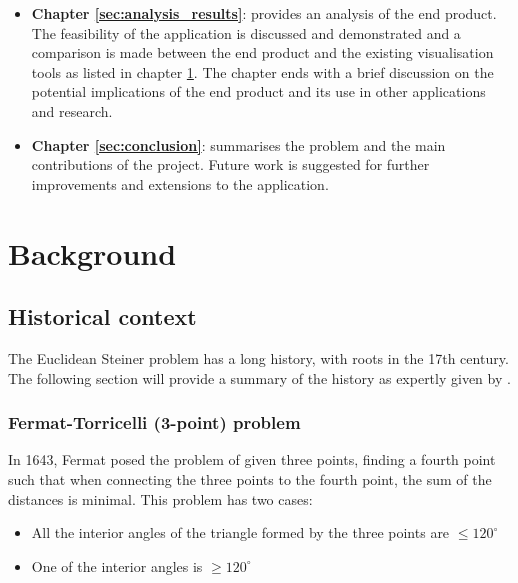 \documentclass{l4proj}
\begin{document}
\begin{itemize}
    \item \textbf{Chapter \ref{sec:analysis_results}}: provides an analysis of the end product. The feasibility of the application is discussed and demonstrated and a comparison is made between the end product and the existing visualisation tools as listed in chapter \ref{sec:background}. The chapter ends with a brief discussion on the potential implications of the end product and its use in other applications and research.
    \item \textbf{Chapter \ref{sec:conclusion}}: summarises the problem and the main contributions of the project. Future work is suggested for further improvements and extensions to the application.
\end{itemize}






\chapter{Background}
\label{sec:background}
\section{Historical context}
The Euclidean Steiner problem has a long history, with roots in the 17th century. The following section will provide a summary of the history as expertly given by \cite{Brazil2014}.

\subsection{Fermat-Torricelli (3-point) problem}
In 1643, Fermat posed the problem of given three points, finding a fourth point such that when connecting the three points to the fourth point, the sum of the distances is minimal. This problem has two cases:
\begin{itemize}
    \item All the interior angles of the triangle formed by the three points are $\le 120^\circ$
    \item One of the interior angles is $\geq 120^\circ$
\end{itemize}
\end{document}
